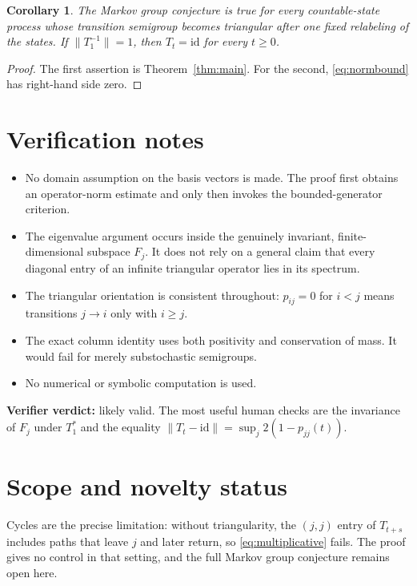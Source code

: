\documentclass[11pt]{article}
\newtheorem{corollary}[theorem]{Corollary}
\newcommand{\id}{\mathrm{id}}
\begin{document}
\begin{corollary}
The Markov group conjecture is true for every countable-state process whose
transition semigroup becomes triangular after one fixed relabeling of the
states. If $\|T_1^{-1}\|=1$, then $T_t=\id$ for every $t\ge0$.
\end{corollary}

\begin{proof}
The first assertion is Theorem~\ref{thm:main}. For the second,
\eqref{eq:normbound} has right-hand side zero.
\end{proof}

\section{Verification notes}

\begin{itemize}
  \item No domain assumption on the basis vectors is made. The proof first
  obtains an operator-norm estimate and only then invokes the bounded-generator
  criterion.
  \item The eigenvalue argument occurs inside the genuinely invariant,
  finite-dimensional subspace $F_j$. It does not rely on a general claim that
  every diagonal entry of an infinite triangular operator lies in its
  spectrum.
  \item The triangular orientation is consistent throughout:
  $p_{ij}=0$ for $i<j$ means transitions $j\to i$ only with $i\ge j$.
  \item The exact column identity uses both positivity and conservation of
  mass. It would fail for merely substochastic semigroups.
  \item No numerical or symbolic computation is used.
\end{itemize}

\noindent\textbf{Verifier verdict:} likely valid. The most useful human
checks are the invariance of $F_j$ under $T_1^*$ and the equality
$\|T_t-\id\|=\sup_j2(1-p_{jj}(t))$.

\section{Scope and novelty status}

Cycles are the precise limitation: without triangularity, the $(j,j)$ entry
of $T_{t+s}$ includes paths that leave $j$ and later return, so
\eqref{eq:multiplicative} fails. The proof gives no control in that setting,
and the full Markov group conjecture remains open here.
\end{document}
